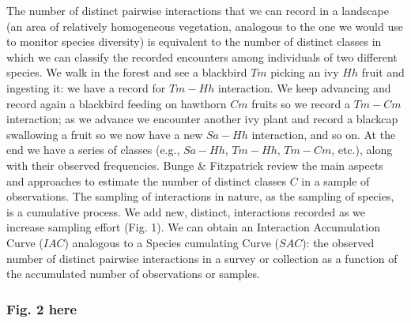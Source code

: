 \documentclass[a4paper,12pt]{article}
\begin{document}
\begin{spacing}{1.0}
 The number of distinct pairwise interactions that we can record in a landscape (an area of relatively homogeneous vegetation, analogous to the one we would use to monitor species diversity) is equivalent to the number of distinct classes in which we can classify the recorded encounters among individuals of two different species. We walk in the forest and see a blackbird $Tm$ picking an ivy $Hh$ fruit and ingesting it: we have a record for $Tm-Hh$ interaction. We keep advancing and record again a blackbird feeding on hawthorn $Cm$ fruits so we record a $Tm-Cm$ interaction; as we advance we encounter another ivy plant and record a blackcap swallowing a fruit so we now have a new $Sa-Hh$ interaction, and so on. At the end we have a series of classes (e.g., $Sa-Hh$, $Tm-Hh$, $Tm-Cm$, etc.), along with their observed frequencies. Bunge \& Fitzpatrick \citep{Bunge:1993ux} review the main aspects and approaches to estimate the number of distinct classes $C$ in a sample of observations. The sampling of interactions in nature, as the sampling of species, is a cumulative process. We add new, distinct, interactions recorded as we increase sampling effort (Fig. 1). We can obtain an Interaction Accumulation Curve ($IAC$) analogous to a Species cumulating Curve ($SAC$): the observed number of distinct pairwise interactions in a survey or collection as a function of the accumulated number of observations or samples\citep{Colwell:2009gv}. 

\subsubsection{Fig. 2 here}
\label{fig.2here}


\end{spacing}
\end{document}
